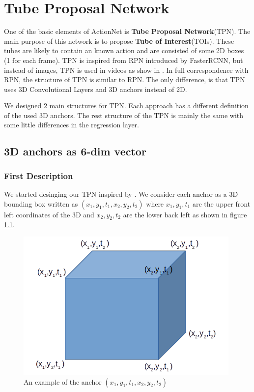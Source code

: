 \documentclass{report}
\begin{document}
\chapter{Tube Proposal Network}

One of the basic elements of ActionNet is \textbf{Tube Proposal Network}(TPN). The main purpose of this network is to propose
\textbf{Tube of Interest}(TOIs). These tubes are likely to contain an known action and are consisted of some 2D boxes
(1 for each frame). TPN is inspired from RPN introduced by FasterRCNN\cite{Ren:2015:FRT:2969239.2969250}, but instead of images, TPN
is used in videos as show in \cite{DBLP:journals/corr/HouCS17}. In full correspondence with RPN, the structure
of TPN is similar to RPN. The only difference, is that TPN uses 3D Convolutional Layers and 3D anchors instead of 2D. \par
We designed 2 main structures for TPN. Each approach has a different definition of the used 3D anchors.
The rest structure of the TPN is mainly the same with some little differences in the regression layer.
\section{ 3D anchors as 6-dim vector}
\subsection{First Description}
We started desinging our TPN inspired by \cite{DBLP:journals/corr/HouCS17}. We consider each anchor as a 3D bounding box written as
$(x_1, y_1, t_1, x_2, y_2, t_2)$ where $x_1, y_1, t_1$
are the upper front left coordinates of the 3D and $x_2, y_2, t_2$ are the lower back left as shown in figure \ref{fig:anchor_6d}.
\begin{figure}[h]
  \centering
  \includegraphics[scale=0.5]{anchor_6d}
  \caption{An example of the anchor $(x_1,y_1,t_1,x_2,y_2,t_2)$}
  \label{fig:anchor_6d}
\end{figure}
\end{document}
